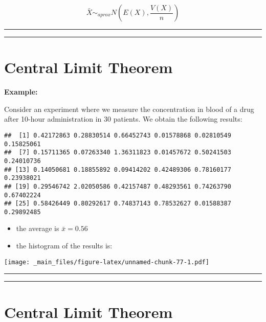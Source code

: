 \documentclass[
]{book}
\begin{document}
\[\bar{X} \sim_{aprox}  N(E(X), \frac{V(X)}{n})\]

\begin{center}\rule{0.5\linewidth}{0.5pt}\end{center}

\begin{center}\rule{0.5\linewidth}{0.5pt}\end{center}

\hypertarget{central-limit-theorem-2}{%
\section{Central Limit Theorem}\label{central-limit-theorem-2}}

\textbf{Example:}

Consider an experiment where we measure the concentration in blood of a drug after 10-hour administration in \(30\) patients. We obtain the following results:

\begin{verbatim}
##  [1] 0.42172863 0.28830514 0.66452743 0.01578868 0.02810549 0.15825061
##  [7] 0.15711365 0.07263340 1.36311823 0.01457672 0.50241503 0.24010736
## [13] 0.14050681 0.18855892 0.09414202 0.42489306 0.78160177 0.23938021
## [19] 0.29546742 2.02050586 0.42157487 0.48293561 0.74263790 0.67402224
## [25] 0.58426449 0.80292617 0.74837143 0.78532627 0.01588387 0.29892485
\end{verbatim}

\begin{itemize}
\item
  the average is \(\bar{x}=0.56\)
\item
  the histogram of the results is:
\end{itemize}

\texttt{[image: \_main\_files/figure-latex/unnamed-chunk-77-1.pdf]}

\begin{center}\rule{0.5\linewidth}{0.5pt}\end{center}

\begin{center}\rule{0.5\linewidth}{0.5pt}\end{center}

\hypertarget{central-limit-theorem-3}{%
\section{Central Limit Theorem}\label{central-limit-theorem-3}}
\end{document}
